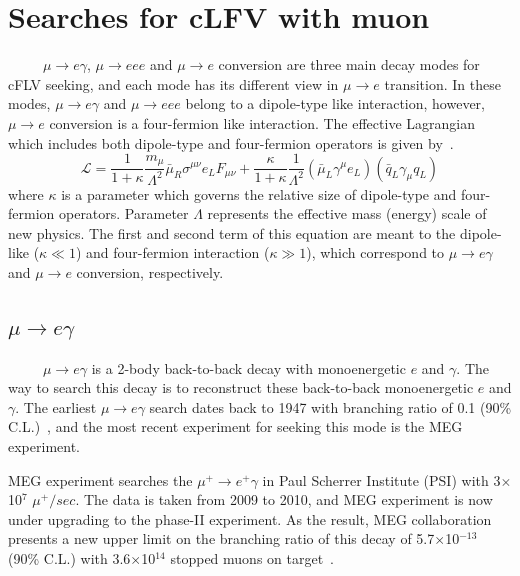 \section{Searches for cLFV with muon}
~~~~~$\mu \rightarrow e\gamma$, $\mu \rightarrow eee$ and $\mu \rightarrow e$ conversion are three main decay modes for cFLV seeking, and each mode has its different view in $\mu \rightarrow e$ transition.
In these modes, $\mu \rightarrow e\gamma$ and $\mu \rightarrow eee$ belong to a dipole-type like interaction, however, $\mu \rightarrow e$ conversion is a four-fermion like interaction.
The effective Lagrangian which includes both dipole-type and four-fermion operators is given by~\cite{degou}.
\begin{equation}
 \mathcal{L} = \frac{1}{1+\kappa}\frac{m_\mu}{\Lambda^2}\bar{\mu}_R\sigma^{\mu\nu}e_LF_{\mu\nu} + \frac{\kappa}{1+\kappa}\frac{1}{\Lambda^2}(\bar\mu_L\gamma^\mu e_L)(\bar q_L\gamma_\mu q_L)
 \label{phtoeq}
\end{equation}
where $\kappa$ is a parameter which governs the relative size of dipole-type and four-fermion operators.
Parameter $\Lambda$ represents the effective mass (energy) scale of new physics.
The first and second term of this equation are meant to the dipole-like ($\kappa \ll 1$) and four-fermion interaction ($\kappa \gg 1$), which correspond to $\mu \rightarrow e\gamma$ and $\mu \rightarrow e$ conversion, respectively.

\subsection{$\mu \rightarrow e \gamma$}
~~~~~$\mu \rightarrow e\gamma$ is a 2-body back-to-back decay with monoenergetic $e$ and $\gamma$.
The way to search this decay is to reconstruct these back-to-back monoenergetic $e$ and $\gamma$.
The earliest $\mu \rightarrow e\gamma$ search dates back to 1947 with branching ratio of 0.1 (90\% C.L.)~\cite{1947}, and the most recent experiment for seeking this mode is the MEG experiment.

MEG experiment searches the $\mu^+ \rightarrow e^{+}\gamma$ in Paul Scherrer Institute (PSI) with 3$\times$10$^7$ $\mu^+/sec$.
The data is taken from 2009 to 2010, and MEG experiment is now under upgrading to the phase-II experiment.
As the result, MEG collaboration presents a new upper limit on the branching ratio of this decay of 5.7$\times$10$^{-13}$ (90\% C.L.) with 3.6$\times$10$^{14}$ stopped muons on target~\cite{meg}.

